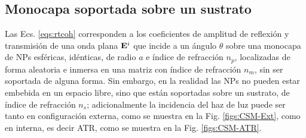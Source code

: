 	 \subsection{Monocapa soportada sobre un sustrato}

Las Ecs. \eqref{eqs:rtcoh} corresponden a los coeficientes de amplitud de reflexión y transmisión de una onda plana $\vb{E}^i$ que incide a un ángulo $\theta$ sobre una monocapa de NPs esféricas, idénticas, de radio $a$ e índice de refracción $n_p$, localizadas de forma aleatoria e inmersa en una matriz con índice de refracción $n_m$, sin ser soportada de alguna forma. Sin embargo, en la realidad las NPs no pueden estar embebida en un espacio libre, sino que están soportadas sobre un sustrato, de índice de refracción $n_s$; adicionalmente la incidencia del haz de luz puede ser tanto en configuración externa, como se muestra en la Fig. \ref{figs:CSM-Ext}, como en interna, es decir ATR, como se muestra en la Fig. \ref{figs:CSM-ATR}.

